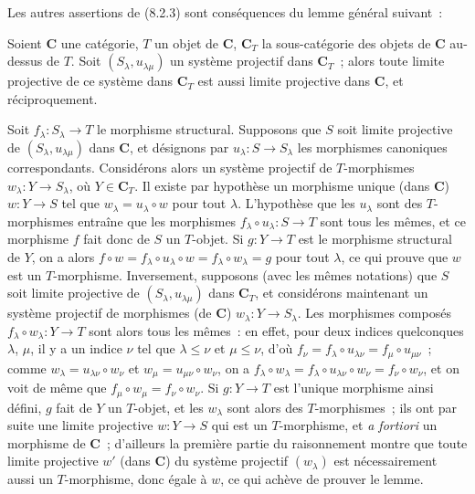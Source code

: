 Les autres assertions de (8.2.3) sont conséquences du lemme général suivant~:

\begin{lemma}[8.2.4]
\label{IV.8.2.4-fr}
Soient $\mathbf C$ une catégorie, $T$ un objet de $\mathbf C$,
$\mathbf C_T$ la sous-catégorie des objets de $\mathbf C$ au-dessus de $T$.
Soit $(S_\lambda,u_{\lambda\mu})$ un système projectif dans $\mathbf C_T$~;
alors toute limite projective de ce système dans $\mathbf C_T$ est aussi
limite projective dans $\mathbf C$, et réciproquement.
\end{lemma}

Soit $f_\lambda:S_\lambda\to T$ le morphisme structural. Supposons que $S$
soit limite projective de $(S_\lambda,u_{\lambda\mu})$ dans $\mathbf C$, et
désignons par $u_\lambda:S\to S_\lambda$ les morphismes canoniques
correspondants. Considérons alors un système projectif de $T$-morphismes
$w_\lambda:Y\to S_\lambda$, où $Y\in\mathbf C_T$. Il existe par hypothèse un
morphisme unique (dans $\mathbf C$) $w:Y\to S$ tel que
$w_\lambda=u_\lambda\circ w$ pour tout $\lambda$. L'hypothèse que les
$u_\lambda$ sont des $T$-morphismes entraîne que les morphismes
$f_\lambda\circ u_\lambda:S\to T$ sont tous les mêmes, et ce morphisme $f$
fait donc de $S$ un $T$-objet. Si $g:Y\to T$ est le morphisme structural de
$Y$, on a alors
$f\circ w=f_\lambda\circ u_\lambda\circ w=f_\lambda\circ w_\lambda=g$ pour
tout $\lambda$, ce qui prouve que $w$ est un $T$-morphisme. Inversement,
supposons (avec les mêmes notations) que $S$ soit limite projective de
$(S_\lambda,u_{\lambda\mu})$ dans $\mathbf C_T$, et considérons maintenant un
système projectif de morphismes (de $\mathbf C$) $w_\lambda:Y\to S_\lambda$.
Les morphismes composés $f_\lambda\circ w_\lambda:Y\to T$ sont alors tous
les mêmes~: en effet, pour deux indices quelconques $\lambda$, $\mu$, il y a
un indice $\nu$ tel que $\lambda\leq\nu$ et $\mu\leq\nu$, d'où
$f_\nu=f_\lambda\circ u_{\lambda\nu}=f_\mu\circ u_{\mu\nu}$~; comme
$w_\lambda=u_{\lambda\nu}\circ w_\nu$ et
$w_\mu=u_{\mu\nu}\circ w_\nu$, on a
$f_\lambda\circ w_\lambda=f_\lambda\circ u_{\lambda\nu}\circ w_\nu
=f_\nu\circ w_\nu$, et on voit de même que
$f_\mu\circ w_\mu=f_\nu\circ w_\nu$. Si $g:Y\to T$ est l'unique morphisme
ainsi défini, $g$ fait de $Y$ un $T$-objet, et les $w_\lambda$ sont alors des
$T$-morphismes~; ils ont par suite une limite projective $w:Y\to S$ qui est
un $T$-morphisme, et \emph{a fortiori} un morphisme de $\mathbf C$~;
d'ailleurs la première partie du raisonnement montre que toute limite
projective $w'$ (dans $\mathbf C$) du système projectif $(w_\lambda)$ est
nécessairement aussi un $T$-morphisme, donc égale à $w$, ce qui achève de
prouver le lemme.

